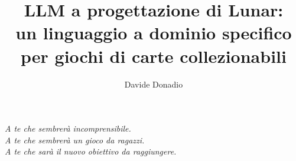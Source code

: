\documentclass{theme/uniprthesis}
\title{LLM a progettazione di Lunar: \\ un linguaggio a dominio specifico \\ per giochi di carte collezionabili}
\author{Davide Donadio}
\begin{document}
\maketitle

\newpage
\thispagestyle{empty}
\null{}
\begin{flushright}
 	\textit{A te che sembrerà incomprensibile.} \\
	\textit{A te che sembrerà un gioco da ragazzi.} \\
  	\textit{A te che sarà il nuovo obiettivo da raggiungere.} \\
\end{flushright}
\null
\newpage

\pagestyle{plain}
\tableofcontents
%
\listoffigures    %
\listofalgorithms %
\listoftables     %
%
%
%

%
\pagestyle{fancy}





%
%
\pagestyle{plain}

%

\cleardoublepage
{}

%

%
%
\end{document}

